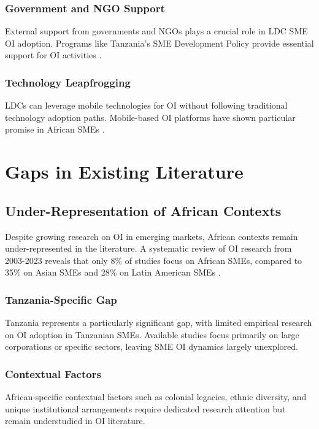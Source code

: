 \subsubsection{Government and NGO Support}
External support from governments and NGOs plays a crucial role in LDC SME OI adoption. Programs like Tanzania's SME Development Policy provide essential support for OI activities \citep{tanzania2003sme}.

\subsubsection{Technology Leapfrogging}
LDCs can leverage mobile technologies for OI without following traditional technology adoption paths. Mobile-based OI platforms have shown particular promise in African SMEs \citep{foster2015mobile}.

\section{Gaps in Existing Literature}

\subsection{Under-Representation of African Contexts}

Despite growing research on OI in emerging markets, African contexts remain under-represented in the literature. A systematic review of OI research from 2003-2023 reveals that only 8\% of studies focus on African SMEs, compared to 35\% on Asian SMEs and 28\% on Latin American SMEs \citep{gassmann2020crossing}.

\subsubsection{Tanzania-Specific Gap}
Tanzania represents a particularly significant gap, with limited empirical research on OI adoption in Tanzanian SMEs. Available studies focus primarily on large corporations or specific sectors, leaving SME OI dynamics largely unexplored.

\subsubsection{Contextual Factors}
African-specific contextual factors such as colonial legacies, ethnic diversity, and unique institutional arrangements require dedicated research attention but remain understudied in OI literature.

